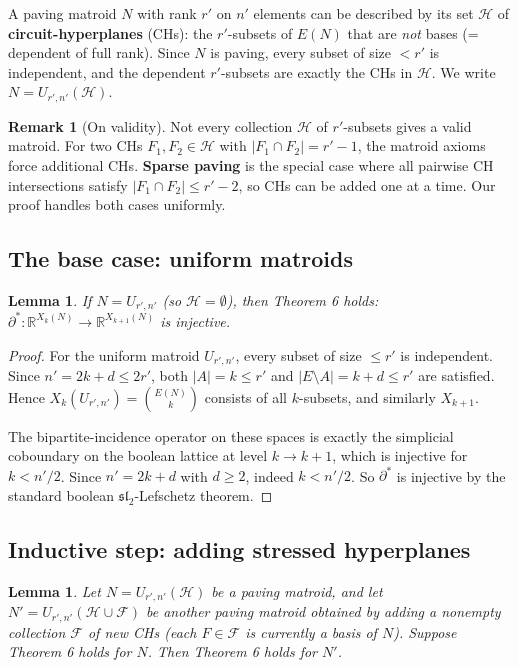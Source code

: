 \documentclass[11pt]{article}
\newtheorem{lemma}[theorem]{Lemma}
\theoremstyle{definition}
\newtheorem{remark}[theorem]{Remark}
\renewcommand{\H}{\mathcal{H}}
\newcommand{\F}{\mathcal{F}}
\begin{document}
A paving matroid $N$ with rank $r'$ on $n'$ elements can be described by its set $\H$ of \textbf{circuit-hyperplanes} (CHs): the $r'$-subsets of $E(N)$ that are \emph{not} bases (= dependent of full rank). Since $N$ is paving, every subset of size $< r'$ is independent, and the dependent $r'$-subsets are exactly the CHs in $\H$. We write $N = U_{r', n'}(\H)$.

\begin{remark}[On validity]
Not every collection $\H$ of $r'$-subsets gives a valid matroid. For two CHs $F_1, F_2 \in \H$ with $|F_1 \cap F_2| = r' - 1$, the matroid axioms force additional CHs. \textbf{Sparse paving} is the special case where all pairwise CH intersections satisfy $|F_1 \cap F_2| \leq r' - 2$, so CHs can be added one at a time. Our proof handles both cases uniformly.
\end{remark}

\subsection{The base case: uniform matroids}

\begin{lemma}
If $N = U_{r', n'}$ (so $\H = \emptyset$), then Theorem 6 holds: $\partial^* : \mathbb{R}^{X_k(N)} \to \mathbb{R}^{X_{k+1}(N)}$ is injective.
\end{lemma}

\begin{proof}
For the uniform matroid $U_{r', n'}$, every subset of size $\leq r'$ is independent. Since $n' = 2k + d \leq 2r'$, both $|A| = k \leq r'$ and $|E \setminus A| = k + d \leq r'$ are satisfied. Hence $X_k(U_{r', n'}) = \binom{E(N)}{k}$ consists of all $k$-subsets, and similarly $X_{k+1}$.

The bipartite-incidence operator on these spaces is exactly the simplicial coboundary on the boolean lattice at level $k \to k+1$, which is injective for $k < n'/2$. Since $n' = 2k + d$ with $d \geq 2$, indeed $k < n'/2$. So $\partial^*$ is injective by the standard boolean $\mathfrak{sl}_2$-Lefschetz theorem.
\end{proof}

\subsection{Inductive step: adding stressed hyperplanes}

\begin{lemma}
Let $N = U_{r', n'}(\H)$ be a paving matroid, and let $N' = U_{r', n'}(\H \cup \F)$ be another paving matroid obtained by adding a nonempty collection $\F$ of new CHs (each $F \in \F$ is currently a basis of $N$). Suppose Theorem 6 holds for $N$. Then Theorem 6 holds for $N'$.
\end{lemma}
\end{document}
